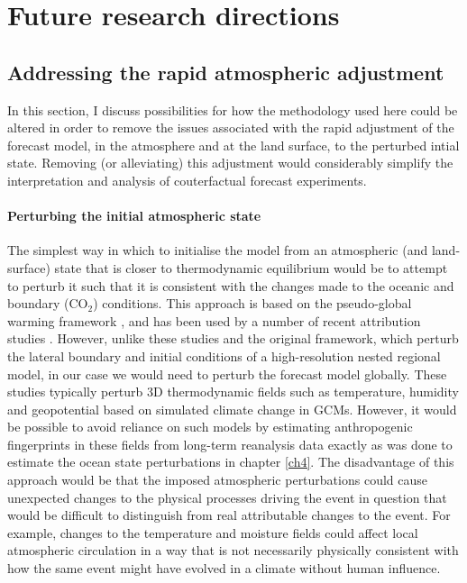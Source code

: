 \section{Future research directions}

  \subsection{Addressing the rapid atmospheric adjustment}

    In this section, I discuss possibilities for how the methodology used here could be altered in order to remove the issues associated with the rapid adjustment of the forecast model, in the atmosphere and at the land surface, to the perturbed intial state. Removing (or alleviating) this adjustment would considerably simplify the interpretation and analysis of couterfactual forecast experiments.

    \paragraph*{Perturbing the initial atmospheric state}

      The simplest way in which to initialise the model from an atmospheric (and land-surface) state that is closer to thermodynamic equilibrium would be to attempt to perturb it such that it is consistent with the changes made to the oceanic and boundary (CO$_2$) conditions. This approach is based on the pseudo-global warming framework \citep{schar_surrogate_1996}, and has been used by a number of recent attribution studies \citep[][]{pall_diagnosing_2017,patricola_anthropogenic_2018,wehner_estimating_2019,reed_forecasted_2020,reed_attribution_2022}. However, unlike these studies and the original framework, which perturb the lateral boundary and initial conditions of a high-resolution nested regional model, in our case we would need to perturb the forecast model globally. These studies typically perturb 3D thermodynamic fields such as temperature, humidity and geopotential based on simulated climate change in GCMs. However, it would be possible to avoid reliance on such models by estimating anthropogenic fingerprints in these fields from long-term reanalysis data \cite{hersbach_era5_2020,laloyaux_cera-20c_2018} exactly as was done to estimate the ocean state perturbations in chapter \ref{ch4}. The disadvantage of this approach would be that the imposed atmospheric perturbations could cause unexpected changes to the physical processes driving the event in question that would be difficult to distinguish from real attributable changes to the event. For example, changes to the temperature and moisture fields could affect local atmospheric circulation in a way that is not necessarily physically consistent with how the same event might have evolved in a climate without human influence.

